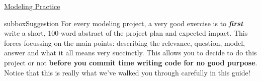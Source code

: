 \begin{textbox}{\href{https://compneuro.neuromatch.io/projects/modelingsteps/ModelingSteps_5through10.html}{Modeling Practice  } }
\begin{subbox}{subbox}{Suggestion}
For every modeling project, a very good exercise is to \textit{\textbf{first}} write a short, 100-word abstract of the project plan and expected impact. This forces focussing on the main points: describing the relevance, question, model, answer and what it all means very succinctly. This allows you to decide to do this project or not \textbf{before you commit time writing code for no good purpose}. Notice that this is really what we've walked you through carefully in this guide! 

\end{subbox}
 
 
\end{textbox}
